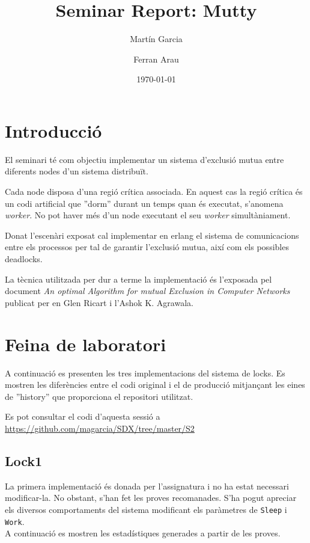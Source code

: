 \documentclass[a4paper, 11pt]{article}
\title{Seminar Report: Mutty}
\author{Martín Garcia \and Ferran Arau}
\date{\today{}}
\begin{document}
\maketitle

\section{Introducció}


El seminari té com objectiu implementar un sistema d'exclusió mutua entre diferents nodes d'un sistema distribuït. 

Cada node disposa d'una regió crítica associada. En aquest cas la regió crítica és un codi artificial que ''dorm'' durant un temps quan és executat, s'anomena \textit{worker}. No pot haver més d'un node executant el seu \textit{worker} simultàniament. 

Donat l'escenàri exposat cal implementar en erlang el sistema de comunicacions entre els processos per tal de garantir l'exclusió mutua, així com els possibles deadlocks. 

La tècnica utilitzada per dur a terme la implementació és l'exposada pel document \textit{An optimal Algorithm for mutual Exclusion in Computer Networks} publicat per en Glen Ricart i l’Ashok K. Agrawala.

\section{Feina de laboratori}

A continuació es presenten les tres implementacions del sistema de locks. Es
mostren les diferències entre el codi original i el de producció mitjançant les
eines de ''history'' que proporciona el repositori utilitzat. 

Es pot consultar el codi d'aquesta sessió a
\url{https://github.com/magarcia/SDX/tree/master/S2}

\subsection{Lock1}

La primera implementació és donada per l'assignatura i no ha estat necessari modificar-la. No obstant, s'han fet les proves recomanades. S'ha pogut apreciar els diversos comportaments del sistema modificant els paràmetres de \texttt{Sleep} i \texttt{Work}. \\ 
A continuació es mostren les estadístiques generades a partir de les proves.
\end{document}
